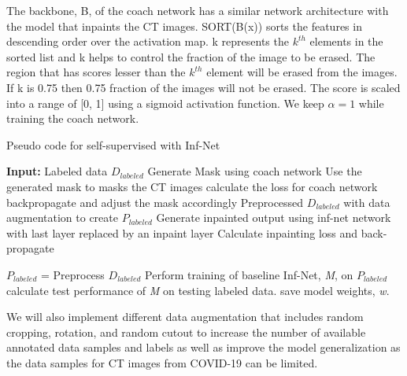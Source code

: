 The backbone, B, of the coach network has a similar network architecture with the model that inpaints the CT images. SORT(B(x)) sorts the features in descending order over the activation map. k represents the $k^{th}$ elements in the sorted list and k helps to control the fraction of the image to be erased. The region that has scores lesser than the $k^{th}$ element will be erased from the images. If k is 0.75 then 0.75 fraction of the images will not be erased. The score is scaled into a range of [0, 1] using a sigmoid activation function. We keep $\alpha = 1$ while training the coach network.

\begin{algorithm}
	\caption{Pseudo code for self-supervised with Inf-Net}
	\label{alg:self-inf-net}
	\begin{algorithmic}
		\STATE \textbf{Input:} Labeled data $D_{labeled}$
			\STATE Generate Mask using coach network
			\STATE Use the generated mask to masks the CT images
			\STATE calculate the loss for coach network
			\STATE backpropagate and adjust the mask accordingly
			\ENDFOR
			\STATE Preprocessed $D_{labeled}$ with data augmentation to create $P_{labeled}$
			\STATE Generate inpainted output using inf-net network with last layer replaced by an inpaint layer
			\STATE Calculate inpainting loss and back-propagate
			\ENDFOR
		\ENDFOR 
		

		\STATE $P_{labeled}$ = Preprocess $D_{labeled}$
		\STATE Perform training of baseline Inf-Net, \textit{M}, on $P_{labeled}$
		\STATE calculate test performance of \textit{M} on testing labeled data.
		\STATE save model weights, \textit{w}.
		\ENDFOR
	\end{algorithmic}
\end{algorithm}

We will also implement different data augmentation that includes random cropping, rotation, and random cutout \cite{ref7,ref15,ref16} to increase the number of available annotated data samples and labels as well as improve the model generalization as the data samples for CT images from COVID-19 can be limited.

